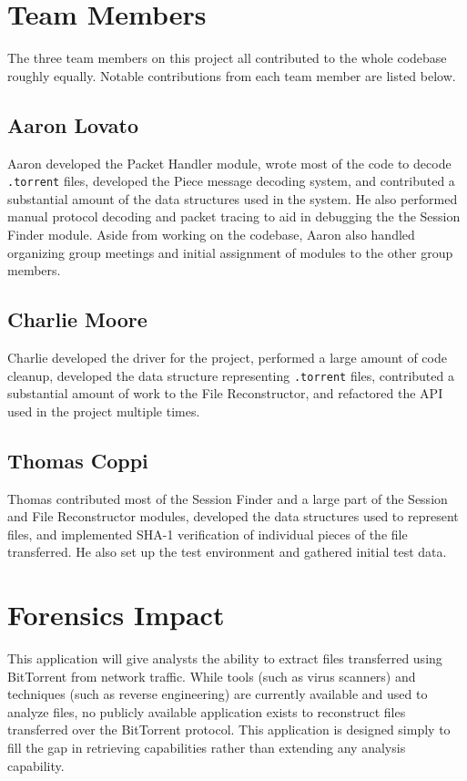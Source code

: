 \documentclass{acm_proc_article-sp}
\begin{document}
\section{Team Members}
The three team members on this project all contributed to the whole codebase
roughly equally. Notable contributions from each team member are listed below.

\subsection{Aaron Lovato}
Aaron developed the Packet Handler module, wrote most of the code to decode
\texttt{.torrent} files, developed the Piece message decoding system, and
contributed a substantial amount of the data structures used in the system. He
also performed manual protocol decoding and packet tracing to aid in debugging
the the Session Finder module. Aside from working on the codebase, Aaron also
handled organizing group meetings and initial assignment of modules to the other
group members.

\subsection{Charlie Moore}
Charlie developed the driver for the project, performed a large amount of code
cleanup, developed the data structure representing \texttt{.torrent} files,
contributed a substantial amount of work to the File Reconstructor, and
refactored the API used in the project multiple times.

\subsection{Thomas Coppi}
Thomas contributed most of the Session Finder and a large part of the Session
and File Reconstructor modules, developed the data structures used to represent
files, and implemented SHA-1 verification of individual pieces of the file
transferred.  He also set up the test environment and gathered initial test
data.

\section{Forensics Impact}
This application will give analysts the ability to extract files transferred
using BitTorrent from network traffic. While tools (such as virus scanners) and
techniques (such as reverse engineering) are currently available and used to
analyze files, no publicly available application exists to reconstruct files
transferred over the BitTorrent protocol. This application is designed simply to
fill the gap in retrieving capabilities rather than extending any analysis
capability.
\end{document}
